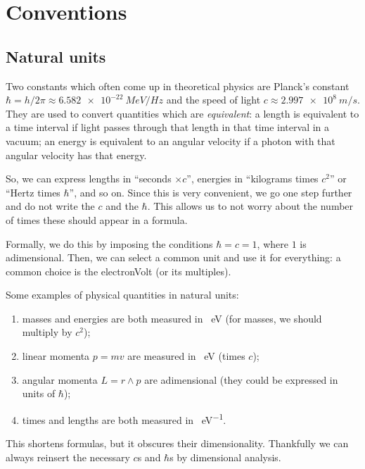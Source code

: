 \documentclass[main.tex]{subfiles}
\begin{document}

\section{Conventions}

\subsection{Natural units}

Two constants which often come up in theoretical physics are Planck's constant \(\hbar = h /2 \pi  \approx \SI{6.582e-22}{MeV / Hz}\) and the speed of light \(c \approx \SI{2.997e8}{m/s}\). 
They are used to convert quantities which are \emph{equivalent}: a length is equivalent to a time interval if light passes through that length in that time interval in a vacuum; an energy is equivalent to an angular velocity if a photon with that angular velocity has that energy.

So, we can express lengths in ``seconds \( \times c\)'', energies in ``kilograms times \(c^2\)'' or ``Hertz times \(\hbar\)'', and so on.
Since this is very convenient, we go one step further and do not write the \(c\) and the \(\hbar\). 
This allows us to not worry about the number of times these should appear in a formula. 

Formally, we do this by imposing the conditions \(\hbar = c = 1\), where \(1\) is adimensional. 
Then, we can select a common unit and use it for everything: a common choice is the electronVolt (or its multiples).

Some examples of physical quantities in natural units:
\begin{enumerate}
  \item masses and energies are both measured in \SI{}{eV} (for masses, we should multiply by \(c^2\));
  \item linear momenta \(p = mv\) are measured in \SI{}{eV} (times \(c\));
  \item angular momenta \(L = r \wedge p\) are adimensional (they could be expressed in units of \(\hbar\));
  \item times and lengths are both measured in \SI{}{eV^{-1}}.
\end{enumerate}

This shortens formulas, but it obscures their dimensionality.
Thankfully we can always reinsert the necessary \(c\)s and \(\hbar\)s by dimensional analysis. 
\end{document}
